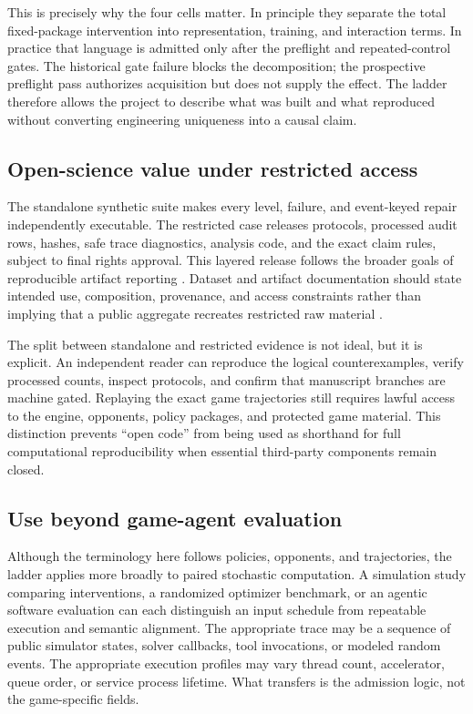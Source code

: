 \documentclass[aps,reprint,superscriptaddress,longbibliography,floatfix]{revtex4-2}
\begin{document}
This is precisely why the four cells matter.  In principle they separate the
total fixed-package intervention into representation, training, and interaction
terms.  In practice that language is admitted only after the preflight and
repeated-control gates.  The historical gate failure blocks the decomposition;
the prospective preflight pass authorizes acquisition but does not supply the
effect.  The ladder therefore allows the project to describe what was built and
what reproduced without converting engineering uniqueness into a causal claim.

\subsection{Open-science value under restricted access}

The standalone synthetic suite makes every level, failure, and event-keyed repair
independently executable.  The restricted case releases protocols, processed
audit rows, hashes, safe trace diagnostics, analysis code, and the exact claim
rules, subject to final rights approval.  This layered release follows the
broader goals of reproducible artifact reporting
\cite{pineau2021reproducibility}.  Dataset and artifact documentation should
state intended use, composition, provenance, and access constraints rather than
implying that a public aggregate recreates restricted raw material
\cite{gebru2021datasheets}.

The split between standalone and restricted evidence is not ideal, but it is explicit.
An independent reader can reproduce the logical counterexamples, verify
processed counts, inspect protocols, and confirm that manuscript branches are
machine gated.  Replaying the exact game trajectories still requires lawful
access to the engine, opponents, policy packages, and protected game material.
This distinction prevents ``open code'' from being used as shorthand for full
computational reproducibility when essential third-party components remain
closed.

\subsection{Use beyond game-agent evaluation}

Although the terminology here follows policies, opponents, and trajectories,
the ladder applies more broadly to paired stochastic computation.  A simulation
study comparing interventions, a randomized optimizer benchmark, or an agentic
software evaluation can each distinguish an input schedule from repeatable
execution and semantic alignment.  The appropriate trace may be a sequence of
public simulator states, solver callbacks, tool invocations, or modeled random
events.  The appropriate execution profiles may vary thread count, accelerator,
queue order, or service process lifetime.  What transfers is the admission
logic, not the game-specific fields.
\end{document}
